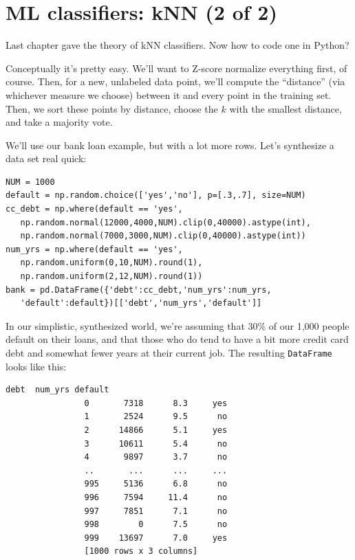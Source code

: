 \chapter[kNN (2 of 2)]
{\LARGE ML classifiers: kNN (2 of 2)}
\label{ch:kNN2}

Last chapter gave the theory of kNN classifiers. Now how to code one in
Python?

Conceptually it's pretty easy. We'll want to Z-score normalize everything
first, of course. Then, for a new, unlabeled data point, we'll compute the
``distance'' (via whichever measure we choose) between it and every point in
the training set. Then, we sort these points by distance, choose the $k$ with
the smallest distance, and take a majority vote.


We'll use our bank loan example, but with a lot more rows. Let's synthesize a
data set real quick:


\begin{Verbatim}[fontsize=\footnotesize,samepage=true,frame=single,framesep=3mm]
NUM = 1000
default = np.random.choice(['yes','no'], p=[.3,.7], size=NUM)
cc_debt = np.where(default == 'yes',
   np.random.normal(12000,4000,NUM).clip(0,40000).astype(int),
   np.random.normal(7000,3000,NUM).clip(0,40000).astype(int))
num_yrs = np.where(default == 'yes',
   np.random.uniform(0,10,NUM).round(1),
   np.random.uniform(2,12,NUM).round(1))
bank = pd.DataFrame({'debt':cc_debt,'num_yrs':num_yrs,
   'default':default})[['debt','num_yrs','default']]
\end{Verbatim}

In our simplistic, synthesized world, we're assuming that 30\% of our 1,000
people default on their loans, and that those who do tend to have a bit more
credit card debt and somewhat fewer years at their current job. The resulting
\texttt{DataFrame} looks like this:

\vspace{-.1in}
\begin{Verbatim}[fontsize=\scriptsize,samepage=true,frame=leftline,framesep=5mm,framerule=1mm]
                        debt  num_yrs default
                0       7318      8.3     yes
                1       2524      9.5      no
                2      14866      5.1     yes
                3      10611      5.4      no
                4       9897      3.7      no
                ..       ...      ...     ...
                995     5136      6.8      no
                996     7594     11.4      no
                997     7851      7.1      no
                998        0      7.5      no
                999    13697      7.0     yes
                [1000 rows x 3 columns]
\end{Verbatim}


